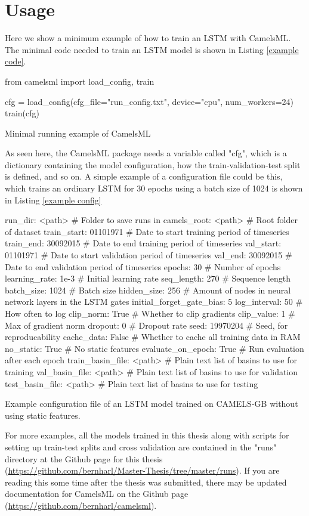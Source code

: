 \section{Usage}
Here we show a minimum example of how to train an LSTM with CamelsML. 
The minimal code needed to train an LSTM model is shown in Listing \ref{example code}. 
\begin{listing}
\begin{pythoncode}
from camelsml import load_config, train

cfg = load_config(cfg_file="run_config.txt", device="cpu", num_workers=24)
train(cfg)
\end{pythoncode}
    \caption[Minimal running example CamelsML.]{Minimal running example of CamelsML}
    \label{example code}
\end{listing}
As seen here, the CamelsML package needs a variable called "cfg", which is a dictionary 
containing the model configuration, how the train-validation-test split is defined, 
and so on. 
A simple example of a configuration file could be this, which trains an ordinary 
LSTM for 30 epochs using a batch size of 1024 is shown in Listing \ref{example config}
\begin{listing}
\begin{cfgcode}
run_dir: <path> # Folder to save runs in
camels_root: <path> # Root folder of dataset
train_start: 01101971 # Date to start training period of timeseries
train_end: 30092015 # Date to end training period of timeseries
val_start: 01101971 # Date to start validation period of timeseries
val_end: 30092015 # Date to end validation period of timeseries
epochs: 30 # Number of epochs
learning_rate: 1e-3 # Initial learning rate
seq_length: 270 # Sequence length
batch_size: 1024 # Batch size
hidden_size:  256 # Amount of nodes in neural network layers in the LSTM gates
initial_forget_gate_bias: 5 
log_interval: 50 # How often to log
clip_norm: True # Whether to clip gradients
clip_value: 1 # Max of gradient norm
dropout: 0 # Dropout rate
seed: 19970204 # Seed, for reproducability 
cache_data: False # Whether to cache all training data in RAM
no_static: True # No static features
evaluate_on_epoch: True # Run evaluation after each epoch
train_basin_file: <path> # Plain text list of basins to use for training 
val_basin_file:  <path> # Plain text list of basins to use for validation
test_basin_file: <path> # Plain text list of basins to use for testing
\end{cfgcode}
    \caption[Example configuration file CamelsML.]{Example configuration file of an LSTM model trained on CAMELS-GB without using static features.}
    \label{example config}
\end{listing}

For more examples, all the models trained in this thesis along with scripts for 
setting up train-test splits and cross validation are contained in the "runs" directory at the 
Github page for this thesis (\url{https://github.com/bernharl/Master-Thesis/tree/master/runs}).
If you are reading this some time after the thesis was submitted, there may be updated 
documentation for CamelsML on the Github page (\url{https://github.com/bernharl/camelsml}).
